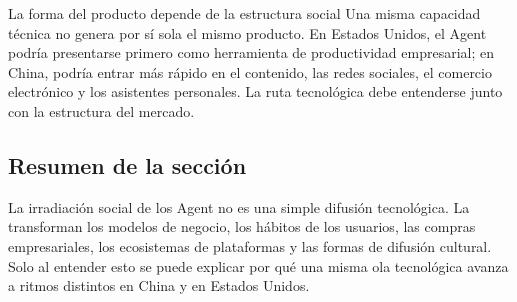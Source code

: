 \begin{importantbox}{La forma del producto depende de la estructura social}
Una misma capacidad técnica no genera por sí sola el mismo producto. En Estados Unidos, el Agent podría presentarse primero como herramienta de productividad empresarial; en China, podría entrar más rápido en el contenido, las redes sociales, el comercio electrónico y los asistentes personales. La ruta tecnológica debe entenderse junto con la estructura del mercado.
\end{importantbox}

\subsection{Resumen de la sección}

La irradiación social de los Agent no es una simple difusión tecnológica. La transforman los modelos de negocio, los hábitos de los usuarios, las compras empresariales, los ecosistemas de plataformas y las formas de difusión cultural. Solo al entender esto se puede explicar por qué una misma ola tecnológica avanza a ritmos distintos en China y en Estados Unidos.
